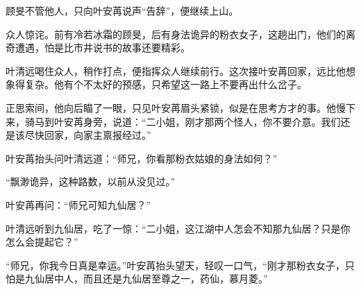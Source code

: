 顾旻不管他人，只向叶安苒说声“告辞”，便继续上山。

众人惊诧。前有冷若冰霜的顾旻，后有身法诡异的粉衣女子，这趟出门，他们的离奇遭遇，怕是比市井说书的故事还要精彩。

叶清远喝住众人，稍作打点，便指挥众人继续前行。这次接叶安苒回家，远比他想象得复杂。他有个不太好的预感，只希望这一路上不要再出什么岔子。

正思索间，他向后瞄了一眼，只见叶安苒眉头紧锁，似是在思考方才的事。他慢下来，骑马到叶安苒身旁，说道：“二小姐，刚才那两个怪人，你不要介意。我们还是该尽快回家，向家主禀报经过。”

叶安苒抬头问叶清远道：“师兄，你看那粉衣姑娘的身法如何？”

“飘渺诡异，这种路数，以前从没见过。”

叶安苒再问：“师兄可知九仙居？”

叶清远听到九仙居，吃了一惊：“二小姐，这江湖中人怎会不知那九仙居？只是你怎么会提起它？”

“师兄，你我今日真是幸运。”叶安苒抬头望天，轻叹一口气，“刚才那粉衣女子，只怕是九仙居中人，而且还是九仙居至尊之一，药仙，慕月菱。”